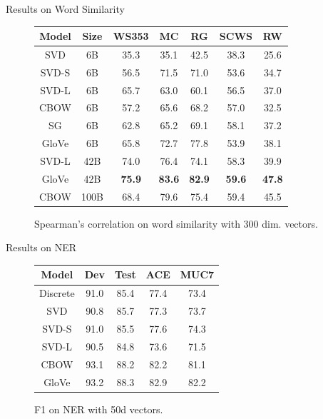 \begin{frame}{Results on Word Similarity}
  \begin{figure}
    \begin{tabular}{|cc|ccccc|}
      \hline
      Model & Size & WS353 & MC & RG & SCWS & RW\\
      \hline
      SVD & 6B & 35.3 & 35.1 & 42.5 & 38.3 & 25.6 \\
      SVD-S & 6B & 56.5 & 71.5 & 71.0 & 53.6 & 34.7\\
      \alert<2->{SVD-L} & 6B & 65.7 & 63.0 & 60.1 & 56.5 & 37.0\\
      CBOW & 6B & 57.2 & 65.6 & 68.2 & 57.0 & 32.5\\
      SG & 6B & 62.8 & 65.2 & 69.1 & 58.1 & 37.2\\
      GloVe & 6B & 65.8 & 72.7 & 77.8 & 53.9 & 38.1\\
      \hline
      \alert<3->{SVD-L} & 42B & 74.0 & 76.4 & 74.1 & 58.3 & 39.9\\
      GloVe & 42B & {\bf 75.9} & {\bf 83.6} & {\bf 82.9} & {\bf 59.6} & {\bf 47.8}\\
      \hline
      CBOW & 100B & 68.4 & 79.6 & 75.4 & 59.4 & 45.5\\
      \hline
    \end{tabular}
    \caption{Spearman's correlation on word similarity with 300 dim. vectors.}
  \end{figure}
\end{frame}

\begin{frame}{Results on NER}
  \begin{figure}
    \begin{tabular}{|c|cccc|}
      \hline
      Model & Dev & Test & ACE & MUC7 \\
      \hline
      Discrete & 91.0 & 85.4 & 77.4 & 73.4\\
      SVD & 90.8 & 85.7 & 77.3 & 73.7\\
      SVD-S & 91.0 & 85.5 & 77.6 & 74.3\\
      SVD-L & 90.5 & 84.8 & 73.6 & 71.5\\
      CBOW & 93.1 & 88.2 & 82.2 & 81.1\\
      GloVe & 93.2 & 88.3 & 82.9 & 82.2\\
      \hline
    \end{tabular}
    \caption{F1 on NER with 50d vectors.}
  \end{figure}
\end{frame}


